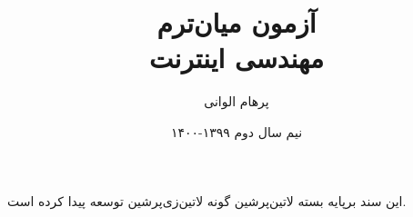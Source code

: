 \documentclass[]{article}
\title{آزمون میان‌ترم‌\\مهندسی اینترنت}
\author{پرهام الوانی}
\date{نیم سال دوم ۱۳۹۹-۱۴۰۰}
\begin{document}
    \maketitle
    \tableofcontents

    
    \vspace*{\fill}
    \begin{center}
این سند برپایه بسته ‌لاتین{‌پرشین} گونه ‌لاتین{‌زی‌پرشین} توسعه پیدا کرده است.
    \end{center}
\end{document}
